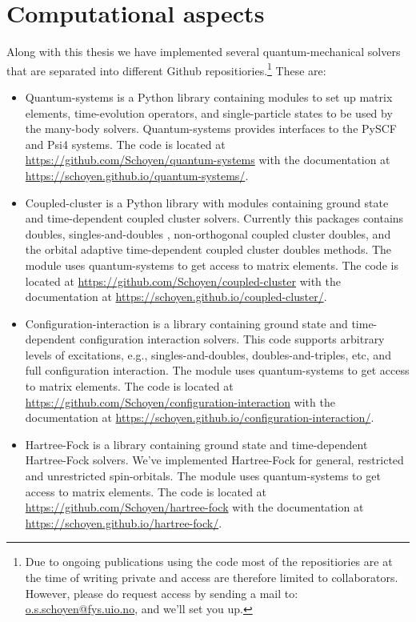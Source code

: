 \chapter{Computational aspects}
    Along with this thesis we have implemented several quantum-mechanical
    solvers that are separated into different Github repositiories.\footnote{%
        Due to ongoing publications using the code most of the repositiories are
        at the time of writing private and access are therefore limited to
        collaborators.
        However, please do request access by sending a mail to:
        \href{mailto:o.s.schoyen@fys.uio.no}{o.s.schoyen@fys.uio.no}, and we'll
        set you up.
    }
    These are:
    \begin{itemize}
        \item Quantum-systems is a Python library containing modules to set up
            matrix elements, time-evolution operators, and single-particle
            states to be used by the many-body solvers.
            Quantum-systems provides interfaces to the PySCF \cite{pyscf} and
            Psi4 \cite{psi4} systems.
            The code is located at
            \url{https://github.com/Schoyen/quantum-systems} with the
            documentation at
            \url{https://schoyen.github.io/quantum-systems/}.
        \item Coupled-cluster is a Python library with modules containing ground
            state and time-dependent coupled cluster solvers.
            Currently this packages contains doubles, singles-and-doubles ,
            non-orthogonal coupled cluster doubles, and the orbital adaptive
            time-dependent coupled cluster doubles methods.
            The module uses quantum-systems to get access to matrix elements.
            The code is located at
            \url{https://github.com/Schoyen/coupled-cluster} with the
            documentation at
            \url{https://schoyen.github.io/coupled-cluster/}.
        \item Configuration-interaction is a library containing ground state and
            time-dependent configuration interaction solvers.
            This code supports arbitrary levels of excitations, e.g.,
            singles-and-doubles, doubles-and-triples, etc, and full
            configuration interaction.
            The module uses quantum-systems to get access to matrix elements.
            The code is located at
            \url{https://github.com/Schoyen/configuration-interaction} with
            the documentation at
            \url{https://schoyen.github.io/configuration-interaction/}.
        \item Hartree-Fock is a library containing ground state and
            time-dependent Hartree-Fock solvers.
            We've implemented Hartree-Fock for general, restricted and
            unrestricted spin-orbitals.
            The module uses quantum-systems to get access to matrix elements.
            The code is located at
            \url{https://github.com/Schoyen/hartree-fock} with
            the documentation at
            \url{https://schoyen.github.io/hartree-fock/}.
    \end{itemize}
